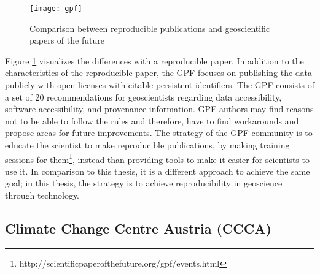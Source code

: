 \documentclass[draft,final]{vutinfth} %
\begin{document}
\begin{figure}[h]
	\centering
	\texttt{[image: gpf]}
	\caption{Comparison between reproducible publications and geoscientific papers of the future \cite{Gil2016TowardTG}}
	\label{fig:gpf} %
\end{figure}

Figure \ref{fig:gpf} visualizes the differences with a reproducible paper. In addition to the characteristics of the reproducible paper, the GPF focuses on publishing the data publicly with open licenses with citable persistent identifiers.
The GPF consists of a set of 20 recommendations for geoscientists regarding data accessibility, software accessibility, and provenance information. GPF authors may find reasons not to be able to follow the rules and therefore, have to find workarounds and propose areas for future improvements. The strategy of the GPF community is to educate the scientist to make reproducible publications, by making training sessions for them\footnote{http://scientificpaperofthefuture.org/gpf/events.html}, instead than providing tools to make it easier for scientists to use it. In comparison to this thesis, it is a different approach to achieve the same goal; in this thesis, the strategy is to achieve reproducibility in geoscience through technology. 

\subsection{Climate Change Centre Austria (CCCA)}
\end{document}
